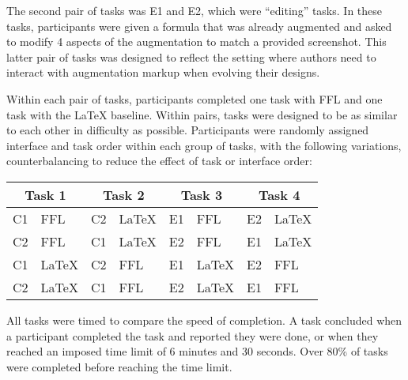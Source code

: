 The second pair of tasks was E1 and E2, which were ``editing'' tasks. In these tasks, participants were given a formula that was already augmented and asked to modify 4 aspects of the augmentation to match a provided screenshot. This latter pair of tasks was designed to reflect the setting where authors need to interact with augmentation markup when evolving their designs.

Within each pair of tasks, participants completed one task with FFL and one task with the LaTeX baseline. Within pairs, tasks were designed to be as similar to each other in difficulty as possible. Participants were randomly assigned interface and task order within each group of tasks, with the following variations, counterbalancing to reduce the effect of task or interface order:

\begin{center}
    \begin{tabular}{r l|r l|r l|r l}
         \multicolumn{2}{c|}{Task 1} & \multicolumn{2}{c|}{Task 2} & \multicolumn{2}{c|}{Task 3} & \multicolumn{2}{c}{Task 4}\\\hline
         C1 &FFL & C2 &LaTeX & E1 &FFL & E2 &LaTeX \\
         C2 &FFL & C1 &LaTeX & E2 &FFL & E1 &LaTeX \\
         C1 &LaTeX & C2 &FFL & E1 &LaTeX & E2 & FFL \\
         C2 &LaTeX & C1 &FFL & E2 &LaTeX & E1 & FFL \\
    \end{tabular}
\end{center}


All tasks were timed to compare the speed of completion. A task concluded when a participant completed the task and reported they were done, or when they reached an imposed time limit of 6 minutes and 30 seconds.
 Over 80\% of tasks were completed before reaching the time limit. 

